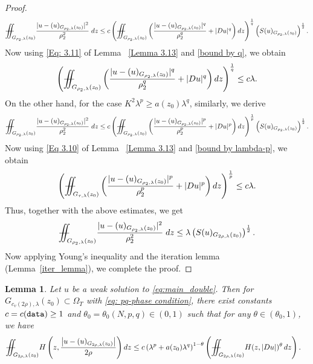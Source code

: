 \documentclass[notitlepage,11pt,reqno]{amsart}
\newtheorem{lemma}[theorem]{Lemma}
\theoremstyle{definition}
\numberwithin{equation}{section}
\newcommand{\iintss}{{\int\hspace{-0.28cm}\int}}
\newcommand{ \miints }{{\iintss\hspace{-0.56cm} -\hspace{-0.15cm}-}}
\newcommand{\miint}[1]{{\miints_{\hspace{-0.13cm}#1}}}
\begin{document}
\begin{proof}
\begin{align*}
   \miint{G_{\rho_2,\lambda}(z_0)}\frac{|u-(u)_{G_{\rho_2,\lambda}(z_0)}|^2}{\rho_2^2}\; dz \leq c\left(\miint{G_{\rho_2, \lambda}(z_0)}\left(\frac{|u-(u)_{G_{\rho_2,\lambda}(z_0)}|^q}{\rho_2^q}+|Du|^q\right)dz\right)^{\frac{1}{q}}\left(S(u)_{G_{\rho_2, \lambda}(z_0)}\right)^{\frac{1}{2}}.
\end{align*}
Now using \eqref{Eq: 3.11} of Lemma ~\ref{Lemma 3.13} and \eqref{bound by q}, we obtain
\begin{align*}
\left(\miint{G_{\rho_2, \lambda}(z_0)}\left(\frac{|u-(u)_{G_{\rho_2,\lambda}(z_0)}|^q}{\rho_2^q}+|Du|^q\right)dz\right)^{\frac{1}{q}} \leq c \lambda.    
\end{align*}
On the other hand, for the case $K^2\lambda^p\geq a(z_0)\lambda^q$, similarly,  we derive
\begin{align*}
   \miint{G_{\rho_2,\lambda}(z_0)}\frac{|u-(u)_{G_{\rho_2,\lambda}(z_0)}|^2}{\rho_2^2}\; dz \leq c\left(\miint{G_{\rho_2, \lambda}(z_0)}\left(\frac{|u-(u)_{G_{\rho_2,\lambda}(z_0)}|^p}{\rho_2^p}+|Du|^p\right)dz\right)^{\frac{1}{p}}\left(S(u)_{G_{\rho_2, \lambda}(z_0)}\right)^{\frac{1}{2}}.
\end{align*}
Now using \eqref{Eq 3.10} of Lemma ~\ref{Lemma 3.13} and \eqref{bound by lambda-p}, we obtain
\begin{align*}
    \left(\miint{G_{\tau, \lambda}(z_0)}\left(\frac{|u-(u)_{G_{\rho_2,\lambda}(z_0)}|^p}{\rho_2^p}+|Du|^p\right)dz\right)^{\frac{1}{p}} \leq c \lambda.
\end{align*}
Thus, together with the above estimates, we get
    \begin{align*}
     \miint{G_{\rho_2,\lambda}(z_0)}\frac{|u-(u)_{G_{\rho_2,\lambda}(z_0)}|^2}{\rho_2^2}\; dz \leq \lambda \left(S(u)_{G_{2\rho, \lambda}(z_0)}\right)^{\frac{1}{2}}.
    \end{align*}
    Now applying Young's inequality and the iteration lemma (Lemma~\ref{iter_lemma}), we complete the proof.
\end{proof}
\begin{lemma}\label{Lemma 3.15}
Let $u$ be a weak solution to \eqref{eq:main_double}. Then for $G_{c_v(2 \rho),\lambda}\left(z_0\right) \subset \Omega_T$ with \eqref{eq: pq-phase condition}, there exist constants $c=c(\textnormal{\texttt{data}}) \geq 1$ and $\theta_0=\theta_0(N, p, q) \in(0,1)$ such that for any $\theta \in\left(\theta_0, 1\right)$, we have
\begin{align}\label{EQQ3.15}
&\miint{G_{2 \rho,\lambda}\left(z_0\right)} H\left(z,\frac{\left|u-(u)_{G_{2\rho, \lambda}(z_0)}\right|}{2 \rho}\right) dz \leq c\left(\lambda^p+a(z_0)\lambda^q\right)^{1-\theta}\left(\miint{G_{2 \rho,\lambda}\left(z_0\right)} H(z, |Du|)^{\theta}\, dz\right). 
\end{align}
\end{lemma}
\end{document}
